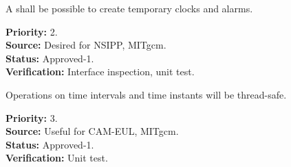 A shall be possible to create temporary clocks and alarms.
\begin{reqlist}
{\bf Priority:} 2. \\
{\bf Source:} Desired for NSIPP, MITgcm. \\
{\bf Status:} Approved-1. \\
{\bf Verification:} Interface inspection, unit test. \\
\end{reqlist}

Operations on time intervals and time instants will be thread-safe.
\begin{reqlist}
{\bf Priority:} 3. \\
{\bf Source:} Useful for CAM-EUL, MITgcm. \\
{\bf Status:} Approved-1. \\
{\bf Verification:} Unit test. 
\end{reqlist}
 















